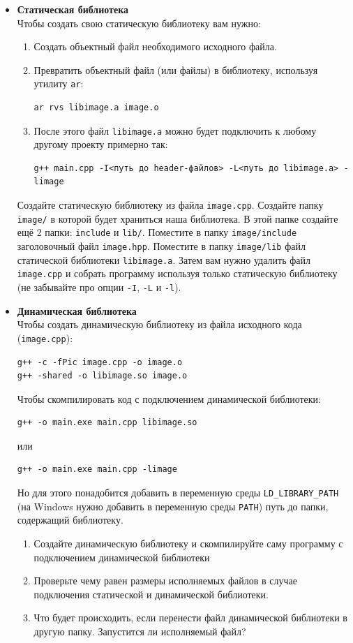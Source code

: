 \documentclass{article}
\begin{document}
\begin{itemize}
\item \textbf{Статическая библиотека} \\
Чтобы создать свою статическую библиотеку вам нужно:
\begin{enumerate}
\item Создать объектный файл необходимого исходного файла.
\item Превратить объектный файл (или файлы) в библиотеку, используя утилиту \texttt{ar}:
\begin{verbatim}
ar rvs libimage.a image.o
\end{verbatim}
\item После этого файл \texttt{libimage.a} можно будет подключить к любому другому проекту примерно так:
\begin{verbatim}
g++ main.cpp -I<путь до header-файлов> -L<путь до libimage.a> -limage
\end{verbatim}
\end{enumerate}
Создайте статическую библиотеку из файла \texttt{image.cpp}. Создайте папку \texttt{image/} в которой будет храниться наша библиотека. В этой папке создайте ещё 2 папки: \texttt{include} и \texttt{lib/}. Поместите в папку \texttt{image/include} заголовочный файл \texttt{image.hpp}. Поместите в папку \texttt{image/lib} файл статической библиотеки \texttt{libimage.a}. Затем вам нужно удалить файл \texttt{image.cpp} и собрать программу используя только статическую библиотеку (не забывайте про опции \texttt{-I}, \texttt{-L} и \texttt{-l}).


\item \textbf{Динамическая библиотека} \\
Чтобы создать динамическую библиотеку из файла исходного кода (\texttt{image.cpp}):
\begin{verbatim}
g++ -c -fPic image.cpp -o image.o
g++ -shared -o libimage.so image.o
\end{verbatim}
Чтобы скомпилировать код с подключением динамической библиотеки:
\begin{verbatim}
g++ -o main.exe main.cpp libimage.so
\end{verbatim}
или
\begin{verbatim}
g++ -o main.exe main.cpp -limage
\end{verbatim}
Но для этого понадобится добавить в переменную среды \texttt{LD\_LIBRARY\_PATH} (на Windows нужно добавить в переменную среды \texttt{PATH}) путь до папки, содержащий библиотеку.
\begin{enumerate}
\item Создайте динамическую библиотеку и скомпилируйте саму программу с подключением динамической библиотеки
\item Проверьте чему равен размеры исполняемых файлов в случае подключения статической и динамической библиотеки.
\item Что будет происходить, если перенести файл динамической библиотеки в другую папку. Запустится ли исполняемый файл?
\end{enumerate}
\end{itemize}
\end{document}
